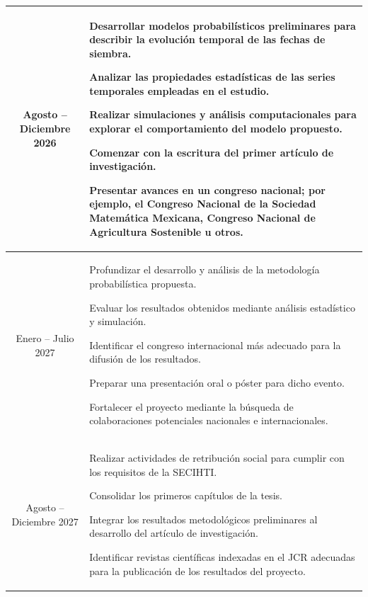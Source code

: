 \begin{longtable}{|c|p{}|}
	\centering Agosto -- Diciembre 2026 & 
	\begin{list}{\textbullet}{%
			\setlength{\leftmargin}{0.2cm}%
			\addtolength{\topsep}{-1.1cm}%
			\addtolength{\labelsep}{-2mm}%
			\addtolength{\itemsep}{-2mm}%
			\setlength{\itemindent}{0cm}}
		\item Desarrollar modelos probabilísticos preliminares para describir la evolución temporal de las fechas de siembra.
		\item Analizar las propiedades estadísticas de las series temporales empleadas en el estudio.
		\item Realizar simulaciones y análisis computacionales para explorar el comportamiento del modelo propuesto.
		\item Comenzar con la escritura del primer artículo de investigación.
		\item Presentar avances en un congreso nacional; por ejemplo, el Congreso Nacional de la Sociedad Matemática Mexicana, Congreso Nacional de Agricultura Sostenible u otros.
	\end{list} \\ \hline
	
	\centering Enero -- Julio 2027      & 
	\begin{list}{\textbullet}{%
			\setlength{\leftmargin}{0.2cm}%
			\addtolength{\topsep}{-1.1cm}%
			\addtolength{\labelsep}{-2mm}%
			\addtolength{\itemsep}{-2mm}%
			\setlength{\itemindent}{0cm}}
		\item Profundizar el desarrollo y análisis de la metodología probabilística propuesta.
		\item Evaluar los resultados obtenidos mediante análisis estadístico y simulación.
		\item Identificar el congreso internacional más adecuado para la difusión de los resultados.
		\item Preparar una presentación oral o póster para dicho evento.
		\item Fortalecer el proyecto mediante la búsqueda de colaboraciones potenciales nacionales e internacionales.
	\end{list} \\ \hline
	
	\centering Agosto -- Diciembre 2027 & 
	\begin{list}{\textbullet}{%
			\setlength{\leftmargin}{0.2cm}%
			\addtolength{\topsep}{-1.1cm}%
			\addtolength{\labelsep}{-2mm}%
			\addtolength{\itemsep}{-2mm}%
			\setlength{\itemindent}{0cm}}
		\item Realizar actividades de retribución social para cumplir con los requisitos de la SECIHTI.
		\item Consolidar los primeros capítulos de la tesis.
		\item Integrar los resultados metodológicos preliminares al desarrollo del artículo de investigación.
		\item Identificar revistas científicas indexadas en el JCR adecuadas para la publicación de los resultados del proyecto.
	\end{list} \\ \hline
	

\end{longtable}
